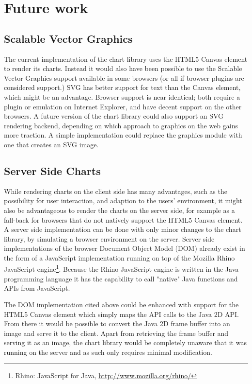 \chapter{Future work}

\section{Scalable Vector Graphics}
The current implementation of the chart library uses the HTML5 Canvas element to render its charts. Instead it would also have been possible to use the Scalable Vector Graphics support available in some browsers (or all if browser plugins are considered support.) SVG has better support for text than the Canvas element, which might be an advantage. Browser support is near identical; both require a plugin or emulation on Internet Explorer, and have decent support on the other browsers. A future version of the chart library could also support an SVG rendering backend, depending on which approach to graphics on the web gains more traction. A simple implementation could replace the graphics module with one that creates an SVG image.

\section{Server Side Charts}
While rendering charts on the client side has many advantages, such as the possibility for user interaction, and adaption to the users' environment, it might also be advantageous to render the charts on the server side, for example as a fall-back for browsers that do not natively support the HTML5 Canvas element. A server side implementation can be done with only minor changes to the chart library, by simulating a browser environment on the server. Server side implementations of the browser Document Object Model (DOM) already exist  in the form of a JavaScript implementation \cite{resig07} running on top of the Mozilla Rhino JavaScript engine\footnote{Rhino: JavaScript for Java, \url{http://www.mozilla.org/rhino/}}. Because the Rhino JavaScript engine is written in the Java programming language it has the capability to call "native" Java functions and APIs from JavaScript. 

The DOM implementation cited above could be enhanced with support for the HTML5 Canvas element which simply maps the API calls to the Java 2D API. From there it would be possible to convert the Java 2D frame buffer into an image and serve it to the client. Apart from retrieving the frame buffer and serving it as an image, the chart library would be completely unaware that it was running on the server and as such only requires minimal modification.

